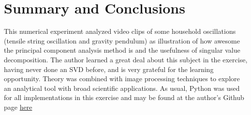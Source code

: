 \documentclass{article}
\begin{document}



\section{Summary and Conclusions}
This numerical experiment analyzed video clips of some household oscillations (tensile string oscillation and gravity pendulum) as illustration of how awesome the principal component analysis method is and the usefulness of singular value decomposition. The author learned a great deal about this subject in the exercise, having never done an SVD before, and is very grateful for the learning opportunity. Theory was combined with image processing techniques to explore an analytical tool with broad scientific applications. As usual, Python was used for all implementations in this exercise and may be found at the author's Github page \href{https://github.com/crewsdw/amath582}{here}
\end{document}

